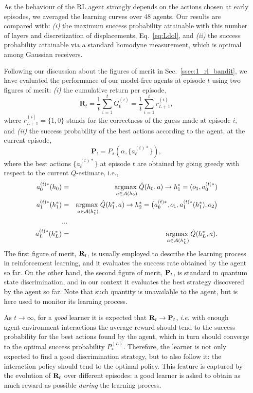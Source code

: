 As the behaviour of the RL agent strongly depends on the actions chosen at early episodes, we averaged the learning curves over 48 agents. Our results are compared with: \textit{(i)} the maximum success probability attainable with this number of layers and discretization of displacements, Eq.~\eqref{eq:Ldol}, and \textit{(ii)} the success probability attainable via a standard homodyne measurement, which is optimal among Gaussian receivers.

Following our discussion about the figures of merit in Sec.~\ref{ssec:1_rl_bandit}, we have evaluated the performance of our model-free agents at episode $t$ using two figures of merit: \textit{(i)} the cumulative return per episode,
\begin{equation}
\mathbf{R}_{t}=\frac1t\sum_{i=1}^{t}G^{(i)}_{0}=\frac1t\sum_{i=1}^{t}r_{L+1}^{(i)},
\end{equation}
where $r_{L+1}^{(i)}=\{1,0\}$ stands for the correctness of the guess made at episode $i$, and \textit{(ii)} the success probability of the best actions according to the agent, at the current episode,
\begin{equation}
\mathbf{P}_{t}=P_{s}(\alpha,\{a_{\ell}^{(t)*}\}),
\end{equation}
where the best actions $\{ a_{\ell}^{(t)*} \}$ at episode $t$ are obtained by going greedy with respect to the current $Q$-estimate, i.e.,
\begin{eqnarray}
  a_{0}^{(t)*}(h_{0})&=&\underset{a \in \mathcal{A}(h_0)}{\text{argmax }} \hat{Q}(h_0,a) \rightarrow h_1^{*} = (o_1, a_0^{(t)*})  \\  \nonumber
  a_{1}^{(t)*}(h^{*}_{1})&=&\underset{a \in \mathcal{A}(h^{*}_1)}{\text{argmax }} \hat{Q}(h^{*}_1,a) \rightarrow h_2^{*} = \big( a_0^{(t)*}, o_1, a_1^{(t)*}(h_1^{*}), o_2 \big) \\ \nonumber
  &...& \\ \nonumber
  a_{L}^{(t)*}(h_L^{*}) &=&\underset{a \in \mathcal{A}(h^{*}_L)}{\text{argmax }} \hat{Q}(h^{*}_L,a).  \nonumber
\end{eqnarray}
The first figure of merit, $\mathbf{R}_{t}$, is usually employed to describe the learning process in reinforcement learning, and it evaluates the success rate obtained by the agent so far. On the other hand, the second figure of merit, $\mathbf{P}_{t}$, is standard in quantum state discrimination, and in our context it evaluates the best strategy discovered by the agent so far. Note that such quantity is unavailable to the agent, but is here used to monitor its learning process.

As $t\rightarrow\infty$, for a \textit{good} learner it is expected that $\mathbf{R}_{t}\rightarrow\mathbf{P}_{t}$, \textit{i.e.} with enough agent-environment interactions the average reward should tend to the success probability for the best actions found by the agent, which in turn should converge to the optimal success probability $P_{*}^{(L)}$. Therefore, the learner is not only expected to find a good discrimination strategy, but to also follow it: the interaction policy should tend to the optimal policy. This feature is captured by the evolution of $\mathbf{R}_{t}$ over different episodes: a good learner is asked to obtain as much reward as possible \textit{during} the learning process.

